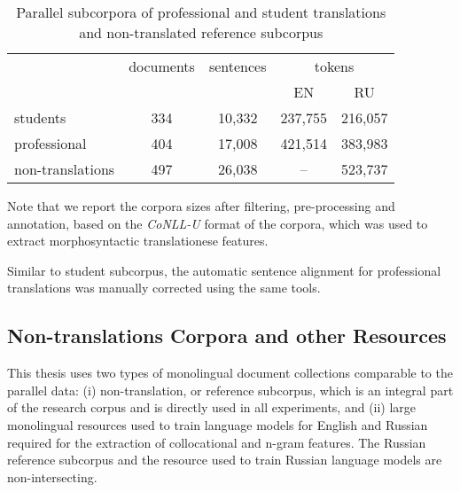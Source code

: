 \begin{table}[H]
	\centering
	\begin{tabular}{l|c|c|cc}
	\toprule
	
	             & documents & sentences & \multicolumn{2}{c}{tokens} \\
				 &      &        & EN      &  RU \\
	\midrule
	students     & 334  & 10,332 & 237,755 & 216,057 \\  
	professional & 404  & 17,008 & 421,514 & 383,983 \\ 
	non-translations & 497  & 26,038 & -- & 523,737 \\  
	\bottomrule
\end{tabular}
	\caption{\label{tab:vars} Parallel subcorpora of professional and student translations and non-translated reference subcorpus}
\end{table}

Note that we report the corpora sizes after filtering, pre-processing and annotation, based on the \textit{CoNLL-U} format of the corpora, which was used to extract morphosyntactic translationese features.

Similar to student subcorpus, the automatic sentence alignment for professional translations was manually corrected using the same tools. 

\subsection{\label{ssec:ref}Non-translations Corpora and other Resources}

This thesis uses two types of monolingual document collections comparable to the parallel data: (i) non-translation, or reference subcorpus, which is an integral part of the research corpus and is directly used in all experiments, and (ii) large monolingual resources used to train language models for English and Russian required for the extraction of collocational and n-gram features. 
The Russian reference subcorpus and the resource used to train Russian language models are non-intersecting.  

